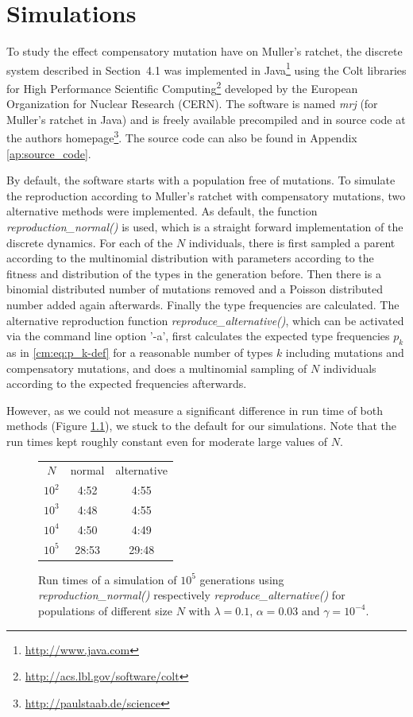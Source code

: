 \chapter{Simulations}
To study the effect compensatory mutation have on Muller's ratchet, the discrete system described in
Section~4.1 was implemented in Java\footnote{\url{http://www.java.com}} using the Colt libraries for
High Performance Scientific Computing\footnote{\url{http://acs.lbl.gov/software/colt}} developed by the
European Organization for Nuclear Research (CERN). The software is named
\emph{mrj} (for Muller's ratchet in Java) and is freely available precompiled
and in source code at the authors
homepage\footnote{\url{http://paulstaab.de/science}}. The source code can also
be found in Appendix \ref{ap:source_code}.

By default, the software starts with a population free of mutations. To
simulate the reproduction according to Muller's ratchet with compensatory mutations, two alternative
methods were implemented. As default, the function \emph{reproduction\_normal()} is used, which is a
straight forward implementation of the discrete dynamics. For each of the $N$ individuals, there is
first sampled a parent according to the multinomial distribution with parameters according to the
fitness and distribution of the types in the generation before. Then there is a
binomial distributed number of mutations removed and a Poisson distributed
number added again afterwards. Finally the type frequencies are calculated. The
alternative reproduction function \emph{reproduce\_alternative()}, which can be
activated via the command line option '-a', first calculates the expected type
frequencies $p_k$ as in \eqref{cm:eq:p_k-def} for a reasonable number of types
$k$ including mutations and compensatory mutations, and does a multinomial sampling
of $N$ individuals according to the expected frequencies afterwards.

However, as we could not measure a
significant difference in run time of both methods (Figure \ref{sim:f:runtimes}), we stuck to the
default for our simulations. Note that the run times kept roughly constant even for
moderate large values of $N$.

\begin{figure}[h]
\centering
\begin{tabular}{ccc} 
$N$ 	& normal 	& alternative \\
$10^2$ 	& 4:52 		& 4:55\\
$10^3$ 	& 4:48 		& 4:55\\
$10^4$ 	& 4:50 		& 4:49\\
$10^5$ 	& 28:53 	& 29:48
\end{tabular}
\caption{Run times of a simulation of $10^5$ generations using \emph{reproduction\_normal()}
respectively \emph{reproduce\_alternative()} for populations of different size $N$ with $\lambda =
0.1$, $\alpha = 0.03$ and $\gamma = 10^{-4}$.}
\label{sim:f:runtimes}
\end{figure}

